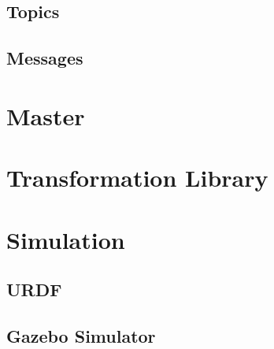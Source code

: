 \subsection{Topics}

\subsection{Messages}



\section{Master}



\section{Transformation Library}



\section{Simulation}



\subsection{URDF}



\subsection{Gazebo Simulator}



\filbreak